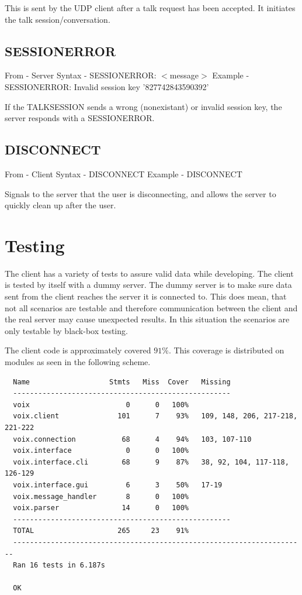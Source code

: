 \documentclass[12pt]{rapport}
\begin{document}
\noindent This is sent by the UDP client after a talk request has been
accepted. It initiates the talk session/conversation.

\subsection*{SESSIONERROR}
From    - Server\newline
Syntax  - SESSIONERROR: $<$message$>$\newline
Example - SESSIONERROR: Invalid session key '827742843590392'\newline

\noindent If the TALKSESSION sends a wrong (nonexistant) or invalid
session key, the server responds with a SESSIONERROR.

\subsection*{DISCONNECT}
From    - Client\newline
Syntax  - DISCONNECT\newline
Example - DISCONNECT\newline

\noindent Signals to the server that the user is disconnecting, and
allows the server to quickly clean up after the user.


\section*{Testing}
The client has a variety of tests to assure valid data while
developing. The client is tested by itself with a dummy server. The
dummy server is to make sure data sent from the client reaches the
server it is connected to. This does mean, that not all scenarios are
testable and therefore communication between the client and the real
server may cause unexpected results. In this situation the scenarios
are only testable by black-box testing.

The client code is approximately covered $91\%$. This coverage is
distributed on modules as seen in the following scheme.

\begin{verbatim}
  Name                   Stmts   Miss  Cover   Missing
  ----------------------------------------------------
  voix                       0      0   100%
  voix.client              101      7    93%   109, 148, 206, 217-218, 221-222
  voix.connection           68      4    94%   103, 107-110
  voix.interface             0      0   100%
  voix.interface.cli        68      9    87%   38, 92, 104, 117-118, 126-129
  voix.interface.gui         6      3    50%   17-19
  voix.message_handler       8      0   100%
  voix.parser               14      0   100%
  ----------------------------------------------------
  TOTAL                    265     23    91%
  ----------------------------------------------------------------------
  Ran 16 tests in 6.187s

  OK
\end{verbatim}
\end{document}
